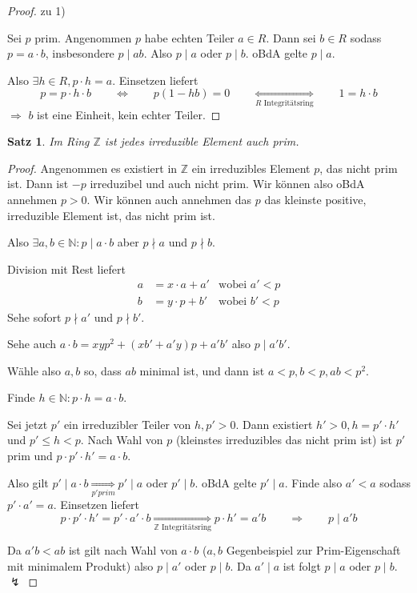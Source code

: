 \documentclass[a4paper,12pt,numbers=noenddot,parskip=full]{scrartcl}
\newcommand{\setN}{\mathbb{N}}
\newcommand{\setZ}{\mathbb{Z}}
\theoremstyle{dotless}
\newtheorem{theorem}{Satz}[section]
\theoremstyle{remark}
\begin{document}
	\begin{proof}
		zu 1)
		
		Sei $p$ prim. Angenommen $p$ habe echten Teiler $a \in R$. Dann sei $b \in R$ sodass $p = a \cdot b$, insbesondere $p \mid ab$. Also $p \mid a$ oder $p \mid b$. oBdA gelte $p \mid a$.
		
		Also $\exists h \in R, p \cdot h = a$. Einsetzen liefert
		\begin{equation*}
			p = p \cdot h \cdot b \qquad \Longleftrightarrow \qquad p(1-hb) = 0 \qquad \underset{\text{$R$ Integritätsring}}{\Longleftrightarrow} \qquad 1 = h \cdot b
		\end{equation*}
		$\Rightarrow$ $b$ ist eine Einheit, kein echter Teiler.
	\end{proof}

	\begin{theorem}
		Im Ring $\setZ$ ist jedes irreduzible Element auch prim.
	\end{theorem}

	\begin{proof}
		Angenommen es existiert in $\setZ$ ein irreduzibles Element $p$, das nicht prim ist. Dann ist $-p$ irreduzibel und auch nicht prim. Wir können also oBdA annehmen $p > 0$. Wir können auch annehmen das $p$ das kleinste positive, irreduzible Element ist, das nicht prim ist.
		
		Also $\exists a,b \in \setN: p \mid a \cdot b$ aber $p \nmid a$ und $p \nmid b$.
		
		Division mit Rest liefert
		\begin{align*}
		 	a &= x \cdot a + a' & \text{wobei $a' < p$}\\
		 	b &= y \cdot p + b' & \text{wobei $b' < p$}
		\end{align*}
		Sehe sofort $p \nmid a'$ und $p \nmid b'$.
		
		Sehe auch $a \cdot b = x y p^2 + (x b' + a' y) p + a'b'$ also $p \mid a' b'$.
		
		Wähle also $a,b$ so, dass $ab$ minimal ist, und dann ist $a < p, b < p, ab < p^2$.
		
		Finde $h \in \setN: p \cdot h = a \cdot b$.
		
		Sei jetzt $p'$ ein irreduzibler Teiler von $h, p' > 0$. Dann existiert $h' > 0, h = p' \cdot h'$ und $p' \leq h < p$. Nach Wahl von $p$ (kleinstes irreduzibles das nicht prim ist) ist $p'$ prim und $p \cdot p' \cdot h' = a \cdot b$.
		
		Also gilt $p' \mid a \cdot b \underset{\text{$p' prim$}}{\Rightarrow} p' \mid a$ oder $p' \mid b$. oBdA gelte $p' \mid a$. Finde also $a' < a$ sodass $p' \cdot a' = a$. Einsetzen liefert 
		\begin{equation*}
			p \cdot p' \cdot h' = p' \cdot a' \cdot b \underset{\text{$\setZ$ Integritätsring}}{\Longrightarrow} p \cdot h' = a' b \qquad\Longrightarrow\qquad p \mid a' b
		\end{equation*}
		
		Da $a' b < ab$ ist gilt nach Wahl von $a \cdot b$ ($a,b$ Gegenbeispiel zur Prim-Eigenschaft mit minimalem Produkt) also $p \mid a'$ oder $p \mid b$. Da $a' \mid a$ ist folgt $p \mid a$ oder $p \mid b$. $\lightning$
	\end{proof}
\end{document}
